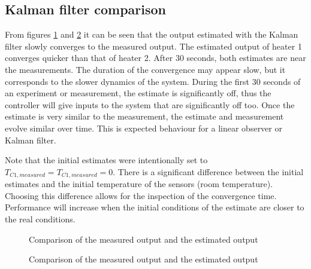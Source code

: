 \subsection{Kalman filter comparison}
From figures \ref{fig:comp_Kalman1} and \ref{fig:comp_Kalman2} it can be seen that the output estimated with the Kalman filter slowly converges to the measured output. The estimated output of heater 1 converges quicker than that of heater 2. After 30 seconds, both estimates are near the measurements. The duration of the convergence may appear slow, but it corresponds to the slower dynamics of the system. During the first 30 seconds of an experiment or measurement, the estimate is significantly off, thus the controller will give inputs to the system that are significantly off too. Once the estimate is very similar to the measurement, the estimate and measurement evolve similar over time. This is expected behaviour for a linear observer or Kalman filter.

Note that the initial estimates were intentionally set to $T_{C1,measured} = T_{C1,measured} = 0$. There is a significant difference between the initial estimates and the initial temperature of the sensors (room temperature). Choosing this difference allows for the inspection of the convergence time. Performance will increase when the initial conditions of the estimate are closer to the real conditions.

\begin{figure}
    \centering
    
    \caption{Comparison of the measured output and the estimated output}
    \label{fig:comp_Kalman1}
\end{figure}
\begin{figure}
    \centering
    
    \caption{Comparison of the measured output and the estimated output}
    \label{fig:comp_Kalman2}
\end{figure}